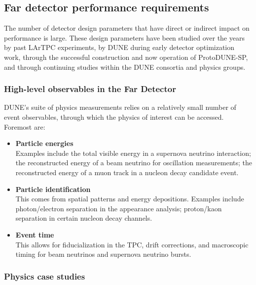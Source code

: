 \subsection{Far detector performance requirements}
\label{sec:exec-summ-fd-requirements}


The number of detector design parameters that have direct
or indirect impact on performance is large.  These design
parameters have been studied over the years by past LArTPC
experiments, by DUNE during early detector optimization work,
through the successful construction and now operation of
ProtoDUNE-SP, and through continuing studies within the
DUNE consortia and physics groups.

\subsubsection{High-level observables in the Far Detector}

DUNE's suite of physics measurements relies on a relatively small
number of event observables, through which the physics of interest
can be accessed.  Foremost are:
%                                                                                                
\begin{itemize}
\item {\bf Particle energies}  \\
Examples include the total visible energy in a supernova
neutrino interaction; the reconstructed energy of a beam
neutrino for oscillation measurements; the reconstructed
energy of a muon track in a nucleon decay candidate event.

\item {\bf Particle identification}  \\
This comes from spatial patterns and energy depositions.
Examples include photon/electron separation in the \nue{}
appearance analysis; proton/kaon separation in certain
nucleon decay channels.

\item {\bf Event time} \\
This allows for fiducialization
in the TPC, drift corrections, and macroscopic timing for
beam neutrinos and supernova neutrino bursts.
\end{itemize}



\subsubsection{Physics case studies}

